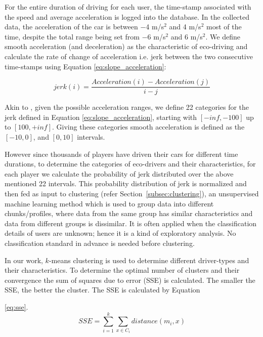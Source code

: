 \documentclass[preprint,authoryear,12pt]{elsarticle}
\begin{document}
For the entire duration of driving for each user, the time-stamp associated with the speed and average acceleration is logged into the database. In the collected data, the acceleration of the car is between $-$4 m/s$^2$ and 4 m/s$^2$ most of the time, despite the total range being set from $-$6 m/s$^2$ and 6 m/s$^2$.  We define smooth acceleration (and deceleration) as the characteristic of eco-driving and calculate the rate of change of acceleration i.e. jerk between the two consecutive time-stamps using Equation \ref{eq:slope_acceleration}:

\begin{equation}\label{eq:slope_acceleration}
jerk(i) = \frac{Acceleration(i) - Acceleration(j)}{i-j}
\end{equation}


Akin to \cite{prendingeroliveira2014}, given the possible acceleration ranges, we define 22 categories for the jerk defined in Equation \ref{eq:slope_acceleration},
starting with $[-inf , -100]$ up to $[100, +inf]$. Giving these categories smooth acceleration is defined as the $[-10, 0]$, and $[0, 10]$ intervals.

However since thousands of players have driven their cars for different time durations, to determine the categories of eco-drivers and their characteristics, for each player we calculate the probability of jerk distributed over the above mentioned 22 intervals. This probability distribution of jerk is normalized and then fed as input to clustering (refer Section~\ref{subsec:clustering}), an unsupervised machine learning method which is used to group data into different chunks/profiles, where data from the same group has similar characteristics and data from different groups is dissimilar. It is often applied when the classification details of users are unknown; hence it is a kind of exploratory analysis. No classification standard in advance is needed before clustering.


In our work, $k$-means clustering is used \citep{KMEAN.1979} to determine different driver-types and their characteristics. To determine the optimal number of clusters and their convergence the sum of squares due to error (SSE) is calculated.  The smaller the SSE, the better the cluster. The SSE is calculated by Equation

\ref{eq:sse}.
\begin{equation}\label{eq:sse}
SSE = \sum\limits_{i=1}^{k} \sum\limits_{x \in C_{i}}distance(m_{i},x)
\end{equation}
\end{document}
